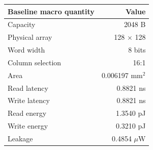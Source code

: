 \begin{tabular}{@{}lr@{}}
\toprule
\textbf{Baseline macro quantity} & \textbf{Value} \\
\midrule
Capacity & 2048 B \\
Physical array & 128 $\times$ 128 \\
Word width & 8 bits \\
Column selection & 16:1 \\
Area & 0.006197 mm$^2$ \\
Read latency & 0.8821 ns \\
Write latency & 0.8821 ns \\
Read energy & 1.3540 pJ \\
Write energy & 0.3210 pJ \\
Leakage & 0.4854 $\mu$W \\
\bottomrule
\end{tabular}
